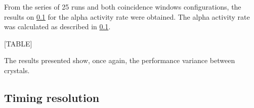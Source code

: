 From the series of 25 runs and both coincidence windows configurations, the results on \ref{} for the alpha activity rate were obtained. The alpha activity rate was calculated as described in \ref{}.

[TABLE]

The results presented show, once again, the performance variance between crystals.

\subsection{Timing resolution}
